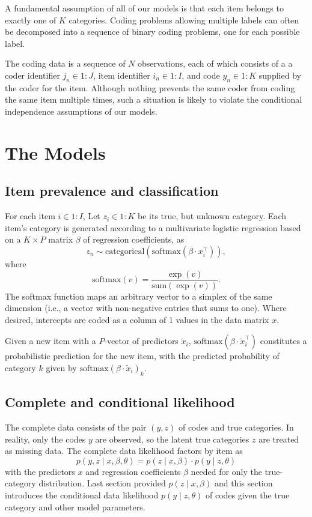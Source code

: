 \documentclass[10pt]{article}
\newcommand{\range}[2]{#1{:}#2}
\newcommand{\rng}[1]{\range{1}{#1}}
\newcommand{\transpose}{^{\top}}
\begin{document}
A fundamental assumption of all of our models is that each item
belongs to exactly one of $K$ categories. Coding problems allowing
multiple labels can often be decomposed into a sequence of binary
coding problems, one for each possible label.

The coding data is a sequence of $N$ observations, each of which
consists of a a coder identifier $j_n \in \rng{J}$, item identifier
$i_n \in \rng{I}$, and code $y_n \in \rng{K}$ supplied by the coder
for the item. Although nothing prevents the same coder from coding the
same item multiple times, such a situation is likely to violate the
conditional independence assumptions of our models.

\section{The Models}

\subsection*{Item prevalence and classification}

For each item $i \in \rng{I}$, Let $z_i \in \rng{K}$ be its true, but
unknown category.  Each item's category is generated according to a
multivariate logistic regression based on a $K \times P$ matrix
$\beta$ of regression coefficients, as
\[
  z_n \sim \textrm{categorical}(\textrm{softmax}(\beta \cdot x_i\transpose)),
\]
where
\[
  \textrm{softmax}(v) =
  \frac
  {\displaystyle \exp(v)}
  {\displaystyle \textrm{sum}(\exp(v))}.
\]
The softmax function maps an arbitrary vector to a simplex of the same
dimension (i.e., a vector with non-negative entries that sums to one).
Where desired, intercepts are coded as a column of 1 values in the data matrix $x$.

Given a new item with a $P$-vector of predictors $\tilde{x}_i$,
$\textrm{softmax}(\beta \cdot \tilde{x}_i\transpose)$ constitutes a
probabilistic prediction for the new item, with the predicted
probability of category $k$ given by
$\textrm{softmax}(\beta \cdot \tilde{x}_i)_k$.

\subsection*{Complete and conditional likelihood}

The complete data consists of the pair $(y, z)$ of codes and true
categories.  In reality, only the codes $y$ are observed, so the 
latent true categories $z$ are treated as missing data.  
The complete data likelihood factors by item as
\[
  p(y, z \mid x, \beta, \theta)
  = p(z \mid x, \beta) \cdot p(y \mid z, \theta)
\]
with the predictors $x$ and regression coefficients $\beta$ needed for
only the true-category distribution. Last section provided $p(z \mid
x, \beta)$ and this section introduces the conditional data likelihood
$p(y \mid z, \theta)$ of codes given the true category and other model
parameters. 
\end{document}
